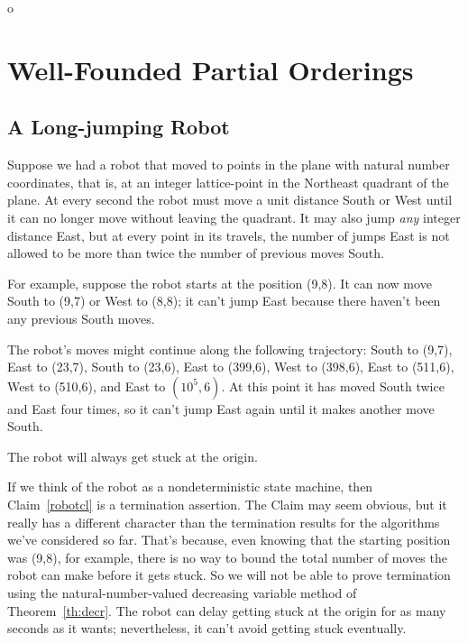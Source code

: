 o%

\def\vl{\text{value}}


\chapter{Well-Founded Partial Orderings}

\section{A Long-jumping Robot}

\iffalse Begin by defining the trivial ``pick how long'' game: P1 picks $n
\in \naturals$, the P2 and P1 alternate making forced moves.  The game
ends after $n$ forced moves; the last person to move wins.  So P1 strategy
is ``pick and even number.''  Insert here the discussion of ``terminates,
but no bound on number of steps...'' used below.

May also tell the ``guess a bigger number game''joke.
\fi

Suppose we had a robot that moved to points in the plane with natural
number coordinates, that is, at an integer lattice-point in the Northeast
quadrant of the plane.  At every second the robot must move a unit
distance South or West until it can no longer move without leaving the
quadrant.  It may also jump \emph{any} integer distance East, but at every
point in its travels, the number of jumps East is not allowed to be more
than twice the number of previous moves South.

For example, suppose the robot starts at the position (9,8).  It can now
move South to (9,7) or West to (8,8); it can't jump East because there
haven't been any previous South moves.

The robot's moves might continue along the following trajectory: South to
(9,7), East to (23,7), South to (23,6), East to (399,6), West to (398,6),
East to (511,6), West to (510,6), and East to $(10^5,6)$.  At this point
it has moved South twice and East four times, so it can't jump East again
until it makes another move South.

\begin{claim}\label{robotcl}
The robot will always get stuck at the origin.
\end{claim}

If we think of the robot as a nondeterministic state machine, then
Claim~\ref{robotcl} is a termination assertion.  The Claim may seem
obvious, but it really has a different character than the termination
results for the algorithms we've considered so far.  That's because, even
knowing that the starting position was (9,8), for example, there is no
way to bound the total number of moves the robot can make before it gets
stuck.  So we will not be able to prove termination using the
natural-number-valued decreasing variable method of Theorem~\ref{th:decr}.
The robot can delay getting stuck at the origin for as many seconds as it
wants; nevertheless, it can't avoid getting stuck eventually.

